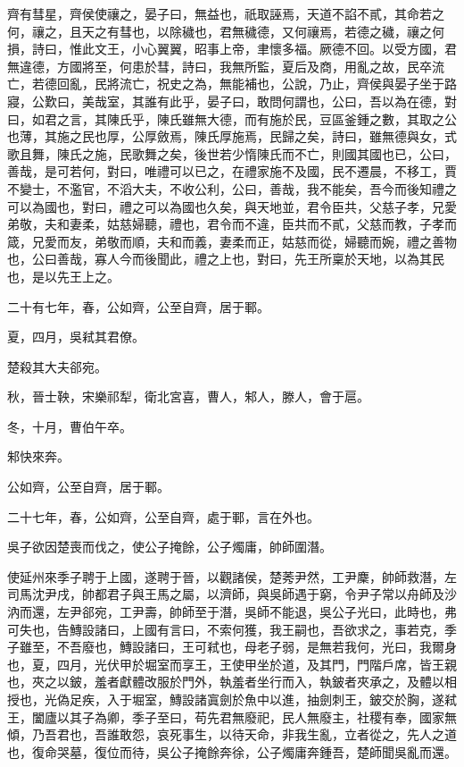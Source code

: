\begin{pinyinscope}
齊有彗星，齊侯使禳之，晏子曰，無益也，祇取誣焉，天道不諂不貳，其命若之何，禳之，且天之有彗也，以除穢也，君無穢德，又何禳焉，若德之穢，禳之何損，詩曰，惟此文王，小心翼翼，昭事上帝，聿懷多福。厥德不回。以受方國，君無違德，方國將至，何患於彗，詩曰，我無所監，夏后及商，用亂之故，民卒流亡，若德回亂，民將流亡，祝史之為，無能補也，公說，乃止，齊侯與晏子坐于路寢，公歎曰，美哉室，其誰有此乎，晏子曰，敢問何謂也，公曰，吾以為在德，對曰，如君之言，其陳氏乎，陳氏雖無大德，而有施於民，豆區釜鍾之數，其取之公也薄，其施之民也厚，公厚斂焉，陳氏厚施焉，民歸之矣，詩曰，雖無德與女，式歌且舞，陳氏之施，民歌舞之矣，後世若少惰陳氏而不亡，則國其國也已，公曰，善哉，是可若何，對曰，唯禮可以已之，在禮家施不及國，民不遷晨，不移工，賈不變士，不濫官，不滔大夫，不收公利，公曰，善哉，我不能矣，吾今而後知禮之可以為國也，對曰，禮之可以為國也久矣，與天地並，君令臣共，父慈子孝，兄愛弟敬，夫和妻柔，姑慈婦聽，禮也，君令而不違，臣共而不貳，父慈而教，子孝而箴，兄愛而友，弟敬而順，夫和而義，妻柔而正，姑慈而從，婦聽而婉，禮之善物也，公曰善哉，寡人今而後聞此，禮之上也，對曰，先王所稟於天地，以為其民也，是以先王上之。

二十有七年，春，公如齊，公至自齊，居于鄆。

夏，四月，吳弒其君僚。

楚殺其大夫郤宛。

秋，晉士鞅，宋樂祁犁，衛北宮喜，曹人，邾人，滕人，會于扈。

冬，十月，曹伯午卒。

邾快來奔。

公如齊，公至自齊，居于鄆。

二十七年，春，公如齊，公至自齊，處于鄆，言在外也。

吳子欲因楚喪而伐之，使公子掩餘，公子燭庸，帥師圍潛。

使延州來季子聘于上國，遂聘于晉，以觀諸侯，楚莠尹然，工尹麇，帥師救潛，左司馬沈尹戌，帥都君子與王馬之屬，以濟師，與吳師遇于窮，令尹子常以舟師及沙汭而還，左尹郤宛，工尹壽，帥師至于潛，吳師不能退，吳公子光曰，此時也，弗可失也，告鱄設諸曰，上國有言曰，不索何獲，我王嗣也，吾欲求之，事若克，季子雖至，不吾廢也，鱄設諸曰，王可弒也，母老子弱，是無若我何，光曰，我爾身也，夏，四月，光伏甲於堀室而享王，王使甲坐於道，及其門，門階戶席，皆王親也，夾之以鈹，羞者獻體改服於門外，執羞者坐行而入，執鈹者夾承之，及體以相授也，光偽足疾，入于堀室，鱄設諸寘劍於魚中以進，抽劍刺王，鈹交於胸，遂弒王，闔廬以其子為卿，季子至曰，苟先君無廢祀，民人無廢主，社稷有奉，國家無傾，乃吾君也，吾誰敢怨，哀死事生，以待天命，非我生亂，立者從之，先人之道也，復命哭墓，復位而待，吳公子掩餘奔徐，公子燭庸奔鍾吾，楚師聞吳亂而還。


\end{pinyinscope}
